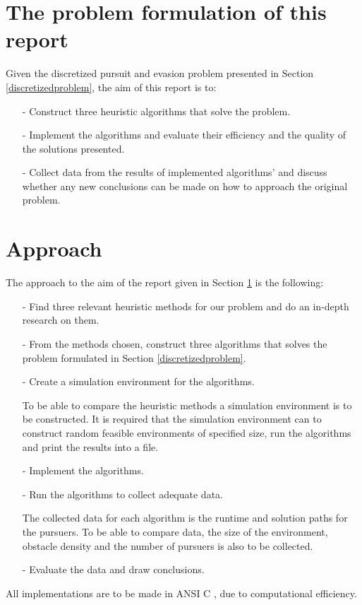 \section{The problem formulation of this report}\label{ourproblemformulation}
Given the discretized pursuit and evasion problem presented in Section \ref{discretizedproblem}, the aim of this report is to:
\begin{enumerate}
\item[-] Construct three heuristic algorithms that solve the problem.
\item[-] Implement the algorithms and evaluate their efficiency and the quality of the solutions presented.
\item[-] Collect data from the results of implemented algorithms' and discuss whether any new conclusions can be made on how to approach the original problem.
\end{enumerate}
\section{Approach}
The approach to the aim of the report given in Section \ref{ourproblemformulation} is the following:
\begin{enumerate}
\item[-] Find three relevant heuristic methods for our problem and do an in-depth research on them.
\item[-] From the methods chosen, construct three algorithms that solves the problem formulated in Section \ref{discretizedproblem}.
\item[-] Create a simulation environment for the algorithms.
\par{To be able to compare the heuristic methods a simulation environment is to be constructed. It is required that the simulation environment can to construct random feasible environments of specified size, run the algorithms and print the results into a file.}
\item[-] Implement the algorithms.
\item[-] Run the algorithms to collect adequate data.
\par{The collected data for each algorithm is the runtime and solution paths for the pursuers. To be able to compare data, the size of the environment, obstacle density and the number of pursuers is also to be collected.}
\item[-] Evaluate the data and draw conclusions.
\end{enumerate}
All implementations are to be made in ANSI C \cite{C-bok}, due to computational efficiency.